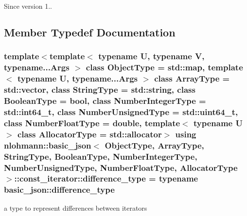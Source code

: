 \begin{DoxySince}{Since}
version 1.. 
\end{DoxySince}


\subsection{Member Typedef Documentation}
\subsubsection[{\texorpdfstring{difference\+\_\+type}{difference_type}}]{\setlength{\rightskip}{0pt plus 5cm}template$<$template$<$ typename U, typename V, typename...\+Args $>$ class Object\+Type = std\+::map, template$<$ typename U, typename...\+Args $>$ class Array\+Type = std\+::vector, class String\+Type  = std\+::string, class Boolean\+Type  = bool, class Number\+Integer\+Type  = std\+::int64\+\_\+t, class Number\+Unsigned\+Type  = std\+::uint64\+\_\+t, class Number\+Float\+Type  = double, template$<$ typename U $>$ class Allocator\+Type = std\+::allocator$>$ using {\bf nlohmann\+::basic\+\_\+json}$<$ Object\+Type, Array\+Type, String\+Type, Boolean\+Type, Number\+Integer\+Type, Number\+Unsigned\+Type, Number\+Float\+Type, Allocator\+Type $>$\+::{\bf const\+\_\+iterator\+::difference\+\_\+type} =  typename {\bf basic\+\_\+json\+::difference\+\_\+type}}\hypertarget{classnlohmann_1_1basic__json_1_1const__iterator_a49d7c3e9ef3280df03052cce988b792f}{}\label{classnlohmann_1_1basic__json_1_1const__iterator_a49d7c3e9ef3280df03052cce988b792f}


a type to represent differences between iterators 

